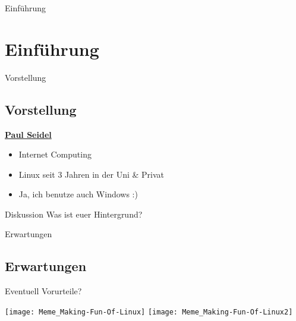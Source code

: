 
\begin{frame}{Einführung}
    \section{Einführung}\label{sec:einfuhrung}
\end{frame}

\begin{frame}{Vorstellung}
    \subsection{Vorstellung}\label{subsec:vorstellung}

    \underline{\textbf{Paul Seidel}}

    \begin{itemize}
        \item Internet Computing
        \item Linux seit 3 Jahren in der Uni \& Privat
        \item Ja, ich benutze auch Windows :)
    \end{itemize}

    \pause
    \vspace{0.5cm}
    \begin{alertblock}{Diskussion}
        Was ist euer Hintergrund?
    \end{alertblock}

\end{frame}
\begin{frame}{Erwartungen}
    \subsection{Erwartungen}\label{subsec:erwartungen}
    Eventuell Vorurteile?

        \texttt{[image: Meme\_Making-Fun-Of-Linux]}
    \endminipage\hfill
        \texttt{[image: Meme\_Making-Fun-Of-Linux2]}
    \endminipage\hfill
\end{frame}

